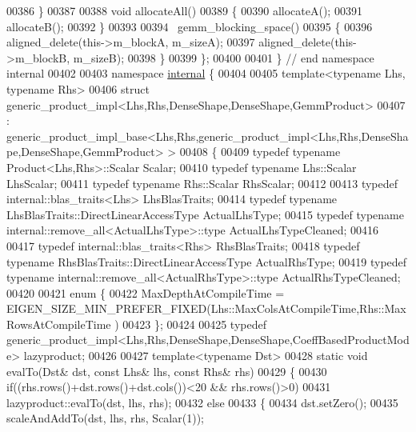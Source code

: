 \begin{DoxyCode}
00386     \}
00387 
00388     \textcolor{keywordtype}{void} allocateAll()
00389     \{
00390       allocateA();
00391       allocateB();
00392     \}
00393 
00394     ~gemm\_blocking\_space()
00395     \{
00396       aligned\_delete(this->m\_blockA, m\_sizeA);
00397       aligned\_delete(this->m\_blockB, m\_sizeB);
00398     \}
00399 \};
00400 
00401 \} \textcolor{comment}{// end namespace internal}
00402 
00403 \textcolor{keyword}{namespace }\hyperlink{namespaceinternal}{internal} \{
00404 
00405 \textcolor{keyword}{template}<\textcolor{keyword}{typename} Lhs, \textcolor{keyword}{typename} Rhs>
00406 \textcolor{keyword}{struct }generic\_product\_impl<Lhs,Rhs,DenseShape,DenseShape,GemmProduct>
00407   : generic\_product\_impl\_base<Lhs,Rhs,generic\_product\_impl<Lhs,Rhs,DenseShape,DenseShape,GemmProduct> >
00408 \{
00409   \textcolor{keyword}{typedef} \textcolor{keyword}{typename} Product<Lhs,Rhs>::Scalar Scalar;
00410   \textcolor{keyword}{typedef} \textcolor{keyword}{typename} Lhs::Scalar LhsScalar;
00411   \textcolor{keyword}{typedef} \textcolor{keyword}{typename} Rhs::Scalar RhsScalar;
00412 
00413   \textcolor{keyword}{typedef} internal::blas\_traits<Lhs> LhsBlasTraits;
00414   \textcolor{keyword}{typedef} \textcolor{keyword}{typename} LhsBlasTraits::DirectLinearAccessType ActualLhsType;
00415   \textcolor{keyword}{typedef} \textcolor{keyword}{typename} internal::remove\_all<ActualLhsType>::type ActualLhsTypeCleaned;
00416 
00417   \textcolor{keyword}{typedef} internal::blas\_traits<Rhs> RhsBlasTraits;
00418   \textcolor{keyword}{typedef} \textcolor{keyword}{typename} RhsBlasTraits::DirectLinearAccessType ActualRhsType;
00419   \textcolor{keyword}{typedef} \textcolor{keyword}{typename} internal::remove\_all<ActualRhsType>::type ActualRhsTypeCleaned;
00420 
00421   \textcolor{keyword}{enum} \{
00422     MaxDepthAtCompileTime = EIGEN\_SIZE\_MIN\_PREFER\_FIXED(Lhs::MaxColsAtCompileTime,Rhs::MaxRowsAtCompileTime
      )
00423   \};
00424 
00425   \textcolor{keyword}{typedef} generic\_product\_impl<Lhs,Rhs,DenseShape,DenseShape,CoeffBasedProductMode> lazyproduct;
00426 
00427   \textcolor{keyword}{template}<\textcolor{keyword}{typename} Dst>
00428   \textcolor{keyword}{static} \textcolor{keywordtype}{void} evalTo(Dst& dst, \textcolor{keyword}{const} Lhs& lhs, \textcolor{keyword}{const} Rhs& rhs)
00429   \{
00430     \textcolor{keywordflow}{if}((rhs.rows()+dst.rows()+dst.cols())<20 && rhs.rows()>0)
00431       lazyproduct::evalTo(dst, lhs, rhs);
00432     \textcolor{keywordflow}{else}
00433     \{
00434       dst.setZero();
00435       scaleAndAddTo(dst, lhs, rhs, Scalar(1));

\end{DoxyCode}
